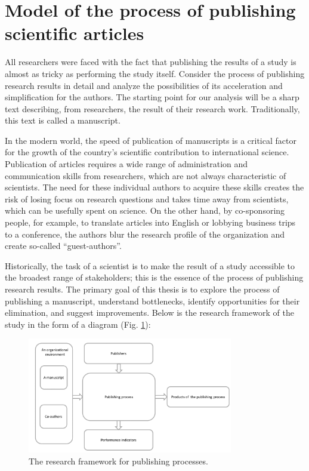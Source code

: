 \documentclass[12pt]{report}
\theoremstyle{definition}
\begin{document}
\section{Model of the process of publishing scientific articles}

All researchers were faced with the fact that publishing the results of a study is almost as tricky as performing the study itself.
Consider the process of publishing research results in detail and analyze the possibilities of its acceleration and simplification for the authors.
The starting point for our analysis will be a sharp text describing, from researchers, the result of their research work.
Traditionally, this text is called a manuscript.

In the modern world, the speed of publication of manuscripts is a critical factor for the growth of the country's scientific contribution to international science.
Publication of articles requires a wide range of administration and communication skills from researchers, which are not always characteristic of scientists.
The need for these individual authors to acquire these skills creates the risk of losing focus on research questions and takes time away from scientists, which can be usefully spent on science.
On the other hand, by co-sponsoring people, for example, to translate articles into English or lobbying business trips to a conference, the authors blur the research profile of the organization and create so-called ``guest-authors''.

Historically, the task of a scientist is to make the result of a study accessible to the broadest range of stakeholders; this is the essence of the process of publishing research results.
The primary goal of this thesis is to explore the process of publishing a manuscript, understand bottlenecks, identify opportunities for their elimination, and suggest improvements.
Below is the research framework of the study in the form of a diagram (Fig. \ref{fig:om1}):

\begin{figure}[ht]
	\centering
	\includegraphics[width=0.8\textwidth]{om1_eng}
	\caption{The research framework for publishing processes.}
	\label{fig:om1}
\end{figure}  
\end{document}
